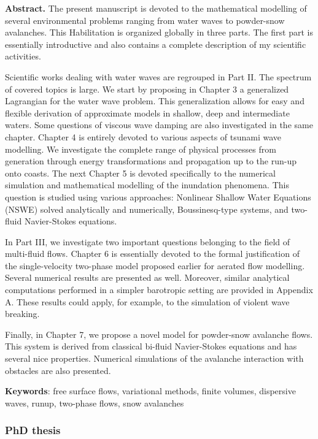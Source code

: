 \documentclass[final, a4paper, oneside, 12pt]{article}
\numberwithin{equation}{section}
\begin{document}
\textbf{Abstract.} The present manuscript is devoted to the mathematical modelling of several environmental problems ranging from water waves to powder-snow avalanches. This Habilitation is organized globally in three parts. The first part is essentially introductive and also contains a complete description of my scientific activities.

Scientific works dealing with water waves are regrouped in Part II. The spectrum of covered topics is large. We start by proposing in Chapter 3 a generalized Lagrangian for the water wave problem. This generalization allows for easy and flexible derivation of approximate models in shallow, deep and intermediate waters. Some questions of viscous wave damping are also investigated in the same chapter. Chapter 4 is entirely devoted to various aspects of tsunami wave modelling. We investigate the complete range of physical processes from generation through energy transformations and propagation up to the run-up onto coasts. The next Chapter 5 is devoted specifically to the numerical simulation and mathematical modelling of the inundation phenomena. This question is studied using various approaches: Nonlinear Shallow Water Equations (NSWE) solved analytically and numerically, Boussinesq-type systems, and two-fluid Navier-Stokes equations.

In Part III, we investigate two important questions belonging to the field of multi-fluid flows. Chapter 6 is essentially devoted to the formal justification of the single-velocity two-phase model proposed earlier for aerated flow modelling. Several numerical results are presented as well. Moreover, similar analytical computations performed in a simpler barotropic setting are provided in Appendix A. These results could apply, for example, to the simulation of violent wave breaking.

Finally, in Chapter 7, we propose a novel model for powder-snow avalanche flows. This system is derived from classical bi-fluid Navier-Stokes equations and has several nice properties. Numerical simulations of the avalanche interaction with obstacles are also presented.

\bigskip
\textbf{Keywords}: free surface flows, variational methods, finite volumes, dispersive waves, runup, two-phase flows, snow avalanches


\subsubsection{PhD thesis}
\end{document}
